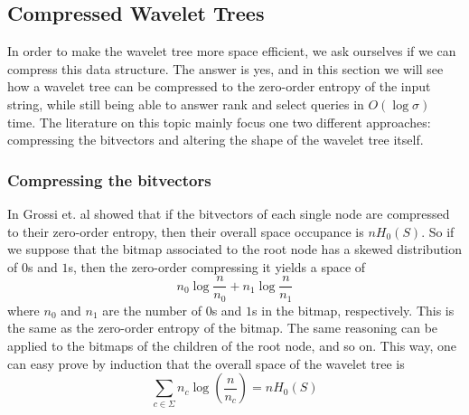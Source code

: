 \vspace{0.4cm}

\clearpage
\subsection{Compressed Wavelet Trees} \label{sec:compressed_WT}
In order to make the wavelet tree more space efficient, we ask ourselves if we can compress this data structure. The answer is yes, and in this section we will see how a wavelet tree can be compressed to the zero-order entropy of the input string, while still being able to answer rank and select queries in $O(\log \sigma)$ time. The literature on this topic mainly focus one two different approaches: compressing the bitvectors and altering the shape of the wavelet tree itself.

\subsubsection{Compressing the bitvectors} \label{subsec:compressing_bitvectors}
In \cite{GrossiWT2003} Grossi et. al showed that if the bitvectors of each single node are compressed to their zero-order entropy, then their overall space occupance is $n H_0(S)$. So if we suppose that the bitmap associated to the root node has a skewed distribution of $0$s and $1$s, then the zero-order compressing it yields a space of
\begin{equation}
    n_0 \log \frac{n}{n_0} + n_1 \log \frac{n}{n_1}
\end{equation}
where $n_0$ and $n_1$ are the number of $0$s and $1$s in the bitmap, respectively. This is the same as the zero-order entropy of the bitmap. The same reasoning can be applied to the bitmaps of the children of the root node, and so on. This way, one can easy prove by induction \cite{navarro2016compact} that the overall space of the wavelet tree is
\begin{equation}
    \sum_{c \in \Sigma} n_c \log (\frac{n}{n_c}) = n H_0(S)
\end{equation}

